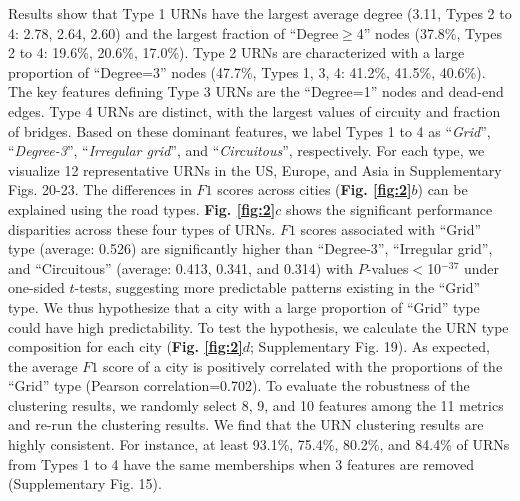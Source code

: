 \documentclass[10pt]{wlscirep}
\begin{document}
Results show that Type 1 URNs have the largest average degree (3.11, Types 2 to 4: 2.78, 2.64, 2.60) and the largest fraction of “Degree$\geq$4” nodes (37.8\%, Types 2 to 4: 19.6\%, 20.6\%, 17.0\%). Type 2 URNs are characterized with a large proportion of “Degree=3” nodes (47.7\%, Types 1, 3, 4: 41.2\%, 41.5\%, 40.6\%). The key features defining Type 3 URNs are the “Degree=1” nodes and dead-end edges. Type 4 URNs are distinct, with the largest values of circuity and fraction of bridges. Based on these dominant features, we label Types 1 to 4 as “\textit{Grid}”, “\textit{Degree-3}”, “\textit{Irregular grid}”, and “\textit{Circuitous}”, respectively. For each type, we visualize 12 representative URNs in the US, Europe, and Asia in Supplementary Figs. 20-23. The differences in $F1$ scores across cities (\textbf{Fig. \ref{fig:2}$b$}) can be explained using the road types. \textbf{Fig. \ref{fig:2}$c$} shows the significant performance disparities across these four types of URNs. $F1$ scores associated with “Grid” type (average: 0.526) are significantly higher than “Degree-3”, “Irregular grid”, and “Circuitous” (average: 0.413, 0.341, and 0.314) with $P$-values$<$10$^{-37}$ under one-sided $t$-tests, suggesting more predictable patterns existing in the “Grid” type. We thus hypothesize that a city with a large proportion of “Grid” type could have high predictability. To test the hypothesis, we calculate the URN type composition for each city (\textbf{Fig. \ref{fig:2}$d$}; Supplementary Fig. 19). As expected, the average $F1$ score of a city is positively correlated with the proportions of the “Grid” type (Pearson correlation=0.702). To evaluate the robustness of the clustering results, we randomly select 8, 9, and 10 features among the 11 metrics and re-run the clustering results. We find that the URN clustering results are highly consistent. For instance, at least 93.1\%, 75.4\%, 80.2\%, and 84.4\% of URNs from Types 1 to 4 have the same memberships when 3 features are removed (Supplementary Fig. 15).
\end{document}

